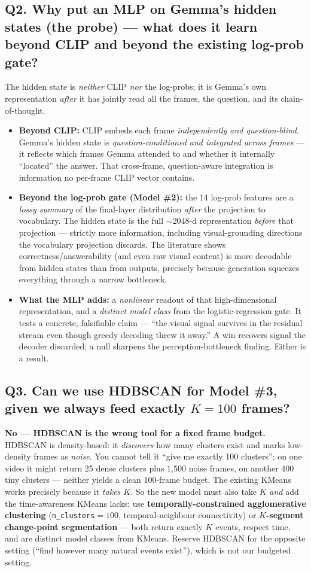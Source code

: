 \documentclass[11pt]{article}
\newcommand{\code}[1]{\texttt{#1}}
\begin{document}
\subsection*{Q2. Why put an MLP on Gemma's hidden states (the probe) --- what does it learn beyond CLIP and beyond the existing log-prob gate?}
The hidden state is \emph{neither} CLIP \emph{nor} the log-probs; it is Gemma's own representation \emph{after} it has jointly read all the frames, the question, and its chain-of-thought.
\begin{itemize}[leftmargin=1.3em,topsep=1pt,itemsep=1pt]
\item \textbf{Beyond CLIP:} CLIP embeds each frame \emph{independently and question-blind}. Gemma's hidden state is \emph{question-conditioned and integrated across frames} --- it reflects which frames Gemma attended to and whether it internally ``located'' the answer. That cross-frame, question-aware integration is information no per-frame CLIP vector contains.
\item \textbf{Beyond the log-prob gate (Model \#2):} the 14 log-prob features are a \emph{lossy summary} of the final-layer distribution \emph{after} the projection to vocabulary. The hidden state is the full $\sim$2048-d representation \emph{before} that projection --- strictly more information, including visual-grounding directions the vocabulary projection discards. The literature shows correctness/answerability (and even raw visual content) is more decodable from hidden states than from outputs, precisely because generation squeezes everything through a narrow bottleneck.
\item \textbf{What the MLP adds:} a \emph{nonlinear} readout of that high-dimensional representation, and a \emph{distinct model class} from the logistic-regression gate. It tests a concrete, falsifiable claim --- ``the visual signal survives in the residual stream even though greedy decoding threw it away.'' A win recovers signal the decoder discarded; a null sharpens the perception-bottleneck finding. Either is a result.
\end{itemize}

\subsection*{Q3. Can we use HDBSCAN for Model \#3, given we always feed exactly $K{=}100$ frames?}
\textbf{No --- HDBSCAN is the wrong tool for a fixed frame budget.} HDBSCAN is density-based: it \emph{discovers} how many clusters exist and marks low-density frames as \emph{noise}. You cannot tell it ``give me exactly 100 clusters''; on one video it might return 25 dense clusters plus 1{,}500 noise frames, on another 400 tiny clusters --- neither yields a clean 100-frame budget. The existing KMeans works precisely because it \emph{takes $K$}. So the new model must also take $K$ \emph{and} add the time-awareness KMeans lacks: use \textbf{temporally-constrained agglomerative clustering} (\code{n\_clusters}$=100$, temporal-neighbour connectivity) or \textbf{$K$-segment change-point segmentation} --- both return exactly $K$ events, respect time, and are distinct model classes from KMeans. Reserve HDBSCAN for the opposite setting (``find however many natural events exist''), which is not our budgeted setting.
\end{document}
